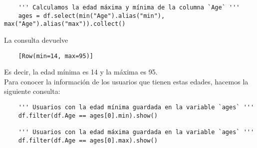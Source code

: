 \documentclass[12pt,a4paper,twoside,openright,titlepage,final]{article}
\begin{document}
\begin{enumerate}
\begin{verbatim}
	''' Calculamos la edad máxima y mínima de la columna `Age` '''
	ages = df.select(min("Age").alias("min"), max("Age").alias("max")).collect()
	\end{verbatim}
	
	La consulta devuelve 
	
	\begin{verbatim}
	[Row(min=14, max=95)]
	\end{verbatim}
	
	Es decir, la edad mínima es 14 y la máxima es 95.\\
	
	Para conocer la información de los usuarios que tienen estas edades, hacemos la siguiente consulta:
	
	\begin{verbatim}
	''' Usuarios con la edad mínima guardada en la variable `ages` '''
	df.filter(df.Age == ages[0].min).show()
	
	''' Usuarios con la edad máxima guardada en la variable `ages` '''
	df.filter(df.Age == ages[0].max).show()
	\end{verbatim}
	

\end{enumerate}
\end{document}
